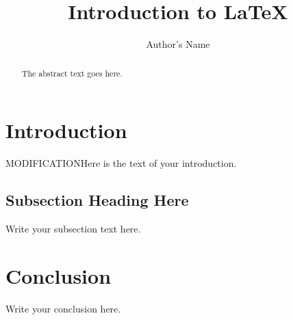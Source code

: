\documentclass{article}
\begin{document}
\title{Introduction to \LaTeX{}}
\author{Author's Name}

\maketitle

\begin{abstract}
The abstract text goes here.
\end{abstract}

\section{Introduction}
MODIFICATIONHere is the text of your introduction.


\subsection{Subsection Heading Here}
Write your subsection text here.

\section{Conclusion}
Write your conclusion here.
\end{document}
